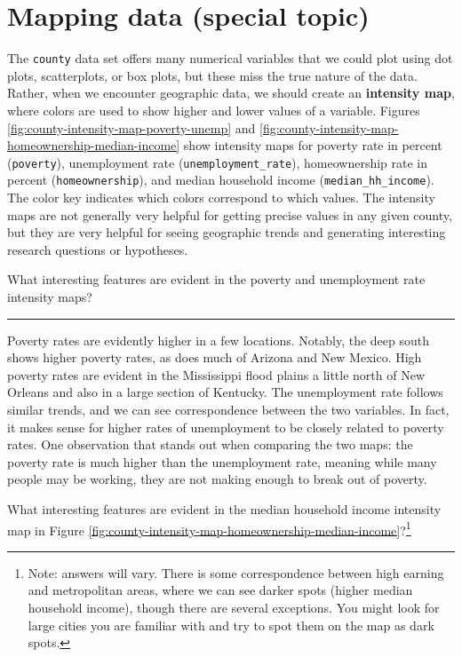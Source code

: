 \documentclass[
  10pt,
  openany]{book}
\theoremstyle{definition}
\theoremstyle{definition}
\theoremstyle{definition}
\theoremstyle{definition}
\theoremstyle{remark}
\begin{document}
\section{Mapping data (special topic)}\label{mapping-data-special-topic}


The \texttt{county} data set offers many numerical variables that we could plot using dot plots, scatterplots, or box plots, but these miss the true nature of the data.
Rather, when we encounter geographic data, we should create an \textbf{intensity map}, where colors are used to show higher and lower values of a variable.
Figures \ref{fig:county-intensity-map-poverty-unemp} and \ref{fig:county-intensity-map-homeownership-median-income} show intensity maps for poverty rate in percent (\texttt{poverty}), unemployment rate (\texttt{unemployment\_rate}), homeownership rate in percent (\texttt{homeownership}), and median household income (\texttt{median\_hh\_income}).
The color key indicates which colors correspond to which values.
The intensity maps are not generally very helpful for getting precise values in any given county, but they are very helpful for seeing geographic trends and generating interesting research questions or hypotheses.

What interesting features are evident in the poverty and unemployment rate intensity maps?

\begin{center}\rule{0.5\linewidth}{0.5pt}\end{center}

Poverty rates are evidently higher in a few locations.
Notably, the deep south shows higher poverty rates, as does much of Arizona and New Mexico.
High poverty rates are evident in the Mississippi flood plains a little north of New Orleans and also in a large section of Kentucky.
The unemployment rate follows similar trends, and we can see correspondence between the two
variables.
In fact, it makes sense for higher rates of unemployment to be closely related to poverty rates.
One observation that stands out when comparing the two maps: the poverty rate is much higher than the unemployment rate, meaning while many people may be working, they are not making enough to break out of poverty.

What interesting features are evident in the median household income intensity map in Figure \ref{fig:county-intensity-map-homeownership-median-income}?\footnote{Note: answers will vary. There is some correspondence between high earning and metropolitan areas, where we can see darker spots (higher median household income), though there are several exceptions. You might look for large cities you are familiar with and try to spot them on the map as dark spots.}
\end{document}
